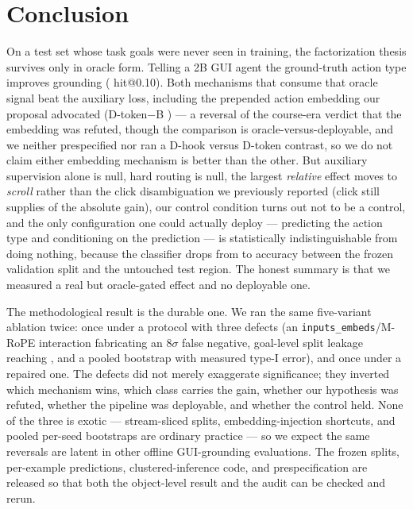 \section{Conclusion}

On a test set whose task goals were never seen in training, the
factorization thesis survives only in oracle form. Telling a 2B GUI agent
the ground-truth action type improves grounding
(\ConfDhvsA{} hit@0.10). Both mechanisms that consume that oracle signal
beat the auxiliary loss, including the prepended action embedding our
proposal advocated (D-token$-$B \ConfDtvsB{}) --- a reversal of the
course-era verdict that the embedding was refuted, though the comparison is
oracle-versus-deployable, and we neither prespecified nor ran a D-hook
versus D-token contrast, so we do not claim either embedding mechanism is
better than the other. But auxiliary supervision alone is null, hard
routing is null, the largest \emph{relative} effect moves to \emph{scroll}
rather than the click disambiguation we previously reported (click still
supplies \ConfClickAbsShare{} of the absolute gain), our control condition
turns out not to be a control, and the only configuration one could
actually deploy --- predicting the action type and conditioning on the
prediction --- is statistically indistinguishable from doing nothing,
because the classifier drops from \ConfStageOneValAcc{} to
\ConfStageOneAcc{} accuracy between the frozen validation split and the
untouched test region. The honest summary is that we measured a real but
oracle-gated effect and no deployable one.

The methodological result is the durable one. We ran the same five-variant
ablation twice: once under a protocol with three defects (an
\texttt{inputs\_embeds}/M-RoPE interaction fabricating an $8\sigma$ false
negative, goal-level split leakage reaching \LeakGoalMax{}, and a pooled
bootstrap with \TypeIPooled{} measured type-I error), and once under a
repaired one. The defects did not merely exaggerate significance; they
inverted which mechanism wins, which class carries the gain, whether our
hypothesis was refuted, whether the pipeline was deployable, and whether
the control held. None of the three is exotic --- stream-sliced splits,
embedding-injection shortcuts, and pooled per-seed bootstraps are ordinary
practice --- so we expect the same reversals are latent in other offline
GUI-grounding evaluations. The frozen splits, per-example predictions,
clustered-inference code, and prespecification are released so that both
the object-level result and the audit can be checked and rerun.

